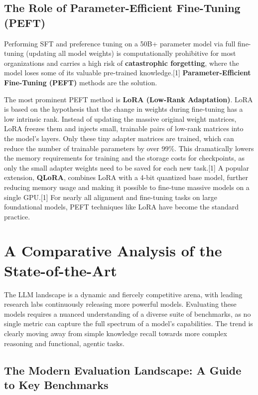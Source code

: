 \documentclass[12pt, a4paper]{article}
\begin{document}
\subsection{The Role of Parameter-Efficient Fine-Tuning (PEFT)}

Performing SFT and preference tuning on a 50B+ parameter model via full fine-tuning (updating all model weights) is computationally prohibitive for most organizations and carries a high risk of \textbf{catastrophic forgetting}, where the model loses some of its valuable pre-trained knowledge.[1] \textbf{Parameter-Efficient Fine-Tuning (PEFT)} methods are the solution.

The most prominent PEFT method is \textbf{LoRA (Low-Rank Adaptation)}. LoRA is based on the hypothesis that the change in weights during fine-tuning has a low intrinsic rank. Instead of updating the massive original weight matrices, LoRA freezes them and injects small, trainable pairs of low-rank matrices into the model's layers. Only these tiny adapter matrices are trained, which can reduce the number of trainable parameters by over 99\%. This dramatically lowers the memory requirements for training and the storage costs for checkpoints, as only the small adapter weights need to be saved for each new task.[1] A popular extension, \textbf{QLoRA}, combines LoRA with a 4-bit quantized base model, further reducing memory usage and making it possible to fine-tune massive models on a single GPU.[1] For nearly all alignment and fine-tuning tasks on large foundational models, PEFT techniques like LoRA have become the standard practice.

\section{A Comparative Analysis of the State-of-the-Art}

The LLM landscape is a dynamic and fiercely competitive arena, with leading research labs continuously releasing more powerful models. Evaluating these models requires a nuanced understanding of a diverse suite of benchmarks, as no single metric can capture the full spectrum of a model's capabilities. The trend is clearly moving away from simple knowledge recall towards more complex reasoning and functional, agentic tasks.

\subsection{The Modern Evaluation Landscape: A Guide to Key Benchmarks}
\end{document}

